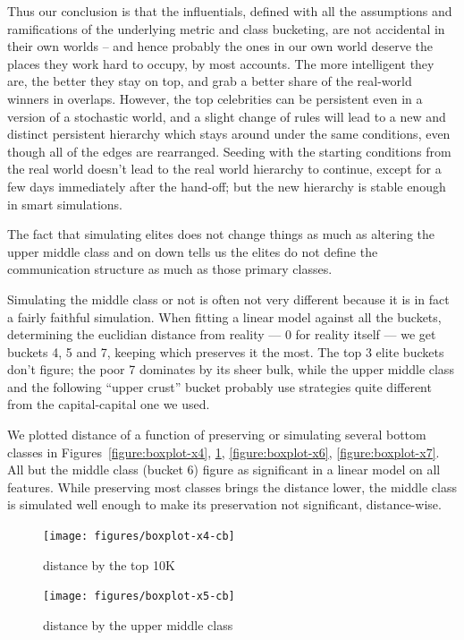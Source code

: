 \documentclass[10pt,oneside]{memoir}
\begin{document}
\begin{Spacing}{2}
Thus our conclusion is that the influentials, defined with all the assumptions and ramifications of the underlying metric and class bucketing, are not accidental in their own worlds -- and hence probably the ones in our own world deserve the places they work hard to occupy, by most accounts.  The more intelligent they are, the better they stay on top, and grab a better share of the real-world winners in overlaps.  However, the top celebrities can be persistent even in a version of a stochastic world, and a slight change of rules will lead to a new and distinct persistent hierarchy which stays around under the same conditions, even though all of the edges are rearranged.  Seeding with the starting conditions from the real world doesn't lead to the real world hierarchy to continue, except for a few days immediately after the hand-off; but the new hierarchy is stable enough in smart simulations.


The fact that simulating elites does not change things as much as altering the upper middle class and on down tells us the elites do not define the communication structure as much as those primary classes.


Simulating the middle class or not is often not very different because it is in fact a fairly faithful simulation.  When fitting a linear model against all the buckets, determining the euclidian distance from reality --- 0 for reality itself --- we get buckets 4, 5 and 7, keeping which preserves it the most.  The top 3 elite buckets don't figure; the poor 7 dominates by its sheer bulk, while the upper middle class and the following ``upper crust'' bucket probably use strategies quite different from the capital-capital one we used.


We plotted distance of a function of preserving or simulating several bottom classes in Figures~\ref{figure:boxplot-x4}, \ref{figure:boxplot-x5}, \ref{figure:boxplot-x6}, \ref{figure:boxplot-x7}.  All but the middle class (bucket 6) figure as significant in a linear model on all features.  While preserving most classes brings the distance lower, the middle class is simulated well enough to make its preservation not significant, distance-wise.



\begin{figure}[ht]
\centering
\texttt{[image: figures/boxplot-x4-cb]}
\label{figure:boxplot-x4}
\caption{distance by the top 10K}
\endminipage\hfill%
%
\centering
\texttt{[image: figures/boxplot-x5-cb]}
\label{figure:boxplot-x5}
\caption{distance by the upper middle class}
\endminipage


\end{figure}
\end{Spacing}
\end{document}
